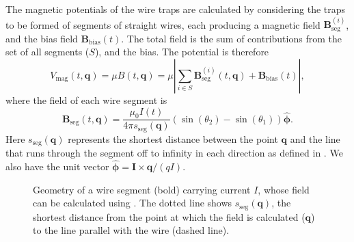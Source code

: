 The magnetic potentials of the wire traps are calculated by considering the
traps to be formed of segments of straight wires, each producing a magnetic
field $\mathbf{B}_\text{seg}^{(i)}$, and the bias field
$\mathbf{B}_\text{bias}(t)$.  The total field is the sum of contributions from
the set of all segments ($S$), and the bias. The potential is therefore
%
\begin{equation} V_\text{mag}(t, \mathbf{q}) = \mu B (t, \mathbf{q}) = \mu
\left| \sum_{i\in S} \mathbf{B}_\text{seg}^{(i)}(t, \mathbf{q}) +
\mathbf{B}_\text{bias}(t)\right|,  \end{equation}
%
where the field of each wire segment is~\cite{Griffiths2017}
%
\begin{equation} \mathbf{B}_\text{seg}(t, \mathbf{q}) = \frac{\mu_0 I(t)}{4\pi
s_\text{seg}(\mathbf{q})} (\sin(\theta_2)  -
\sin(\theta_1))\hat{\mathbf{\phi}}. \label{sim:eq:segmentfield}
\end{equation}
%
Here $s_\text{seg}(\mathbf{q})$ represents the shortest distance between the
point $\mathbf{q}$ and the line that runs through the segment off to infinity
in each direction as defined in . We also have
the unit vector $\hat{\mathbf{\phi}} = \mathbf{I}\times\mathbf{q}/(qI)$.

\begin{figure}[h]
\centering
  \caption[Geometry of a wire segment]{
    Geometry of a wire segment (bold) carrying current $I$, whose field
  can be calculated using . The dotted line
  shows $s_\text{seg}(\mathbf{q})$, the shortest distance from the point at
  which the field is calculated ($\mathbf{q}$) to the line parallel with the
  wire (dashed line).
  }
  \label{sim:fig:wiresegment}
\end{figure}

